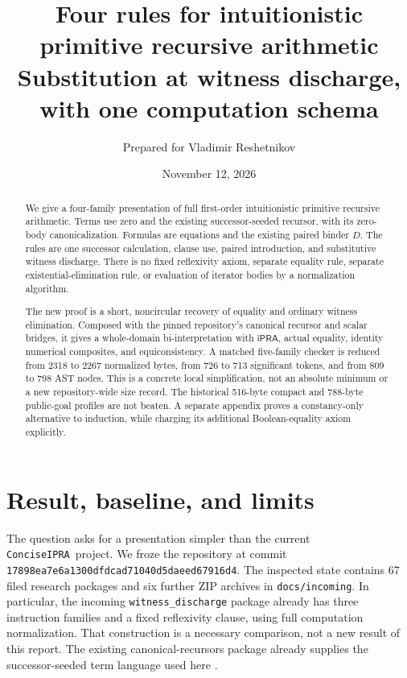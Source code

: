 \documentclass[11pt]{article}
\title{Four rules for intuitionistic primitive recursive arithmetic\\[5pt]
\large Substitution at witness discharge, with one computation schema}
\author{Prepared for Vladimir Reshetnikov}
\date{November 12, 2026}
\theoremstyle{definition}\newtheorem{definition}[theorem]{Definition}
\newcommand{\ipra}{\mathsf{iPRA}}
\newcommand{\repo}{\texttt{ConciseIPRA}}
\begin{document}
\maketitle
\begin{abstract}
We give a four-family presentation of full first-order intuitionistic
primitive recursive arithmetic. Terms use zero and the existing
successor-seeded recursor, with its zero-body canonicalization. Formulas
are equations and the existing paired binder $D$. The rules are one
successor calculation, clause use, paired introduction, and substitutive
witness discharge. There is no fixed reflexivity axiom, separate equality
rule, separate existential-elimination rule, or evaluation of iterator
bodies by a normalization algorithm.

The new proof is a short, noncircular recovery of equality and ordinary
witness elimination. Composed with the pinned repository's canonical
recursor and scalar bridges, it gives a whole-domain bi-interpretation
with $\ipra$, actual equality, identity numerical composites, and
equiconsistency. A matched five-family checker is reduced from 2318 to
2267 normalized bytes, from 726 to 713 significant tokens, and from 809
to 798 AST nodes. This is a concrete local simplification, not an absolute
minimum or a new repository-wide size record. The historical 516-byte
compact and 788-byte public-goal profiles are not beaten. A separate
appendix proves a constancy-only alternative to induction, while charging
its additional Boolean-equality axiom explicitly.
\end{abstract}
\setcounter{tocdepth}{1}
{\small\tableofcontents}
\newpage

\section{Result, baseline, and limits}

The question asks for a presentation simpler than the current
\repo\ project. We froze the repository at commit
\texttt{17898ea7e6a1300dfdcad71040d5daeed67916d4}. The inspected state
contains 67 filed research packages and six further ZIP archives in
\texttt{docs/incoming}. In particular, the incoming
\texttt{witness\_discharge} package already has three instruction families
and a fixed reflexivity clause, using full computation normalization.
That construction is a necessary comparison, not a new result of this
report. The existing canonical-recursors package already supplies the
successor-seeded term language used here \cite{readme,canonical,name}.
\end{document}

